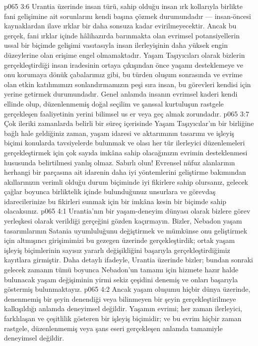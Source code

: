 \vs p065 3:6 Urantia üzerinde insan türü, sahip olduğu insan ırk kollarıyla birlikte fani gelişimine ait sorunlarını kendi başına çözmek durumundadır --- insan\hyp{}öncesi kaynaklardan ilave ırklar bir daha sonsuza kadar evirilmeyecektir. Ancak bu gerçek, fani ırklar içinde hâlihazırda barınmakta olan evrimsel potansiyellerin ussal bir biçimde gelişimi vasıtasıyla insan ilerleyişinin daha yüksek engin düzeylerine olan erişime engel olmamaktadır. Yaşam Taşıyıcıları olarak bizlerin gerçekleştirdiği insan iradesinin ortaya çıkışından önce yaşamı desteklemeye ve onu korumaya dönük çabalarımız gibi, bu türden oluşum sonrasında ve evrime olan etkin katılımımızı sonlandırmamızın peşi sıra insan, bu görevleri kendisi için yerine getirmek durumundadır. Genel anlamda insanın evrimsel kaderi kendi ellinde olup, düzenlenmemiş doğal seçilim ve şanssal kurtuluşun rastgele gerçekleşen faaliyetinin yerini bilimsel us er veya geç almak zorundadır.
\vs p065 3:7 Çok ileriki zamanlarda belirli bir süreç içerisinde Yaşam Taşıyıcılar’ın bir birliğine bağlı hale geldiğiniz zaman, yaşam idaresi ve aktarımının tasarımı ve işleyiş biçimi konularda tavsiyelerde bulunmak ve olası her tür ilerleyici düzenlemeleri gerçekleştirmek için çok sayıda imkâna sahip olacağınızın evrimin desteklenmesi hususunda belirtilmesi yanlış olmaz. Sabırlı olun! Evrensel nüfuz alanlarının herhangi bir parçasına ait idarenin daha iyi yöntemlerini geliştirme bakımından akıllarınızın verimli olduğu durum biçiminde iyi fikirlere sahip olursanız, gelecek çağlar boyunca birliktelik içinde bulunduğunuz unsurlara ve görevdaş idarecilerinize bu fikirleri sunmak için bir imkâna kesin bir biçimde sahip olacaksınız.
\vs p065 4:1 Urantia’nın bir yaşam\hyp{}deneyim dünyası olarak bizlere görev yerleşkesi olarak verildiği gerçeğini gözden kaçırmayın. Bizler, Nebadon yaşam tasarımlarının Satania uyumluluğunu değiştirmek ve mümkünse onu geliştirmek için altmışıncı girişimimizi bu gezegen üzerinde gerçekleştirdik; ortak yaşam işleyiş biçimlerinin sayısız yararlı değişikliğini başarıyla gerçekleştirdiğimiz kayıtlara girmiştir. Daha detaylı ifadeyle, Urantia üzerinde bizler; bundan sonraki gelecek zamanın tümü boyunca Nebadon’un tamamı için hizmete hazır halde bulunacak yaşam değişiminin yirmi sekiz çeşidini denemiş ve onları başarıyla göstermiş bulunmaktayız.
\vs p065 4:2 Ancak yaşam oluşumu hiçbir dünya üzerinde, denenmemiş bir şeyin denendiği veya bilinmeyen bir şeyin gerçekleştirilmeye kalkışıldığı anlamda deneyimsel değildir. Yaşamın evrimi; her zaman ilerleyici, farklılaşan ve çeşitlilik gösteren bir işleyiş biçimidir; ve bu evrim hiçbir zaman rastgele, düzenlenmemiş veya şans eseri gerçekleşen anlamda tamamiyle deneyimsel değildir.
